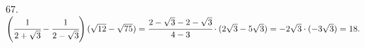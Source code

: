 67. $\left(\cfrac{1}{2+\sqrt{3}}-\cfrac{1}{2-\sqrt{3}}\right)(\sqrt{12}-\sqrt{75})=\cfrac{2-\sqrt{3}-2-\sqrt{3}}{4-3}\cdot(2\sqrt{3}-5\sqrt{3})=
-2\sqrt{3}\cdot(-3\sqrt{3})=18.$\\
